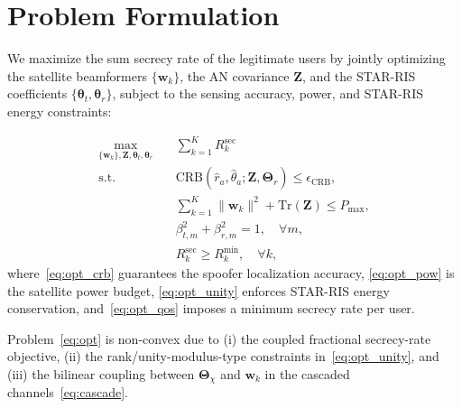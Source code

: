 \section{Problem Formulation}\label{sec:problem}

We maximize the sum secrecy rate of the legitimate users by jointly optimizing the satellite beamformers $\{\mathbf{w}_k\}$, the AN covariance $\mathbf{Z}$, and the STAR-RIS coefficients $\{\boldsymbol{\theta}_t, \boldsymbol{\theta}_r\}$, subject to the sensing accuracy, power, and STAR-RIS energy constraints:

\begin{subequations}\label{eq:opt}
\begin{align}
\max_{\{\mathbf{w}_k\}, \mathbf{Z}, \boldsymbol{\theta}_t, \boldsymbol{\theta}_r} \quad & \sum_{k=1}^{K} R_k^{\mathrm{sec}} \label{eq:opt_obj}\\
\text{s.t.} \quad & \mathrm{CRB}(\hat{r}_a, \hat{\theta}_a; \mathbf{Z}, \boldsymbol{\Theta}_r) \le \epsilon_{\mathrm{CRB}}, \label{eq:opt_crb}\\
& \sum_{k=1}^{K} \|\mathbf{w}_k\|^2 + \mathrm{Tr}(\mathbf{Z}) \le P_{\max}, \label{eq:opt_pow}\\
& \beta_{t,m}^2 + \beta_{r,m}^2 = 1, \quad \forall m, \label{eq:opt_unity}\\
& R_k^{\mathrm{sec}} \ge R_k^{\min}, \quad \forall k, \label{eq:opt_qos}
\end{align}
\end{subequations}
where~\eqref{eq:opt_crb} guarantees the spoofer localization accuracy, \eqref{eq:opt_pow} is the satellite power budget, \eqref{eq:opt_unity} enforces STAR-RIS energy conservation, and~\eqref{eq:opt_qos} imposes a minimum secrecy rate per user.

Problem~\eqref{eq:opt} is non-convex due to (i) the coupled fractional secrecy-rate objective, (ii) the rank/unity-modulus-type constraints in~\eqref{eq:opt_unity}, and (iii) the bilinear coupling between $\boldsymbol{\Theta}_\chi$ and $\mathbf{w}_k$ in the cascaded channels~\eqref{eq:cascade}.
